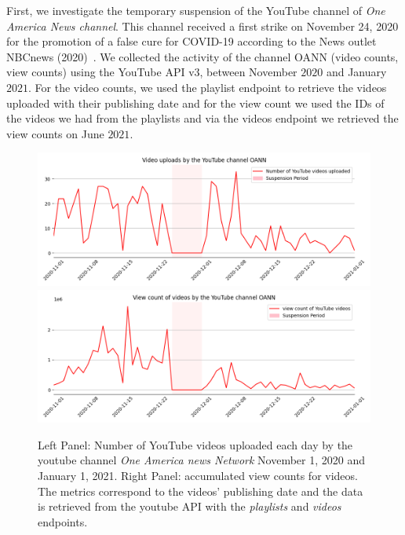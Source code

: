 \documentclass{article}
\begin{document}
\smallskip

First, we investigate the temporary suspension of the YouTube channel of {\it One America News channel}. This channel received a first strike on November 24, 2020 for the promotion of  a false cure for COVID-19 according to the News outlet NBCnews (2020)~\cite{nbcnews}. We collected the activity of the channel OANN (video counts, view counts) using  the YouTube API v3, between November $2020$ and January $2021$. For the video counts, we used the playlist endpoint to retrieve the videos uploaded with their publishing date and for the view count we used the IDs of the videos we had from the playlists and via the videos endpoint we retrieved the view counts on June $2021$.%

\begin{figure}[h]
	\centering
		\includegraphics[scale=0.27]{../figure/OANN_videos_yt.png}
		\includegraphics[scale=0.27]{../figure/OANN_views_yt.png} 
	\caption{Left Panel: Number of YouTube videos uploaded each day by the youtube channel {\it One America news Network} November 1, 2020 and January 1, 2021. Right Panel: accumulated view counts for videos. The metrics correspond to the videos’  publishing date and the data is retrieved from the youtube API with the {\it playlists} and  {\it videos} endpoints. }
	\label{fig1_oann}
\end{figure}
\end{document}
